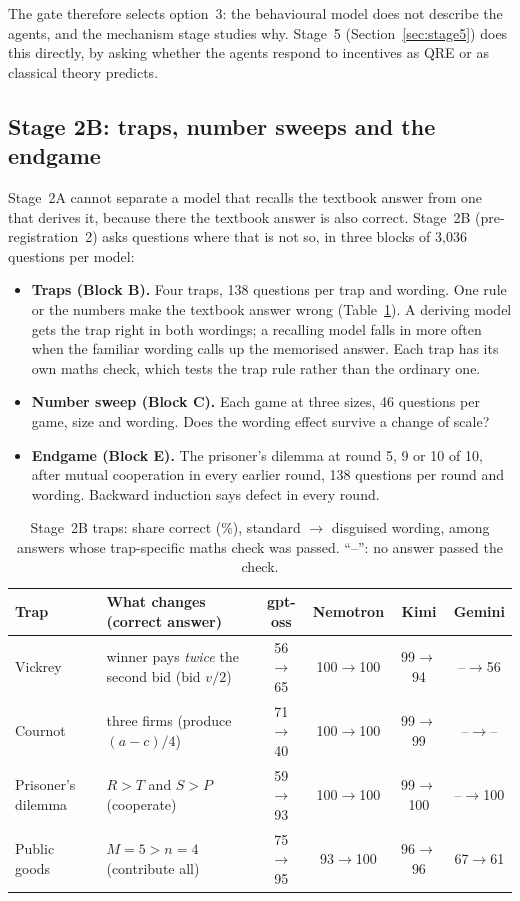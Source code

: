 \documentclass[11pt]{article}
\theoremstyle{definition}
\theoremstyle{remark}
\begin{document}
The gate therefore selects option~3: the behavioural model does not describe the agents, and the
mechanism stage studies why. Stage~5 (Section~\ref{sec:stage5}) does this directly, by asking
whether the agents respond to incentives as QRE or as classical theory predicts.

\subsection{Stage 2B: traps, number sweeps and the endgame}\label{sec:stage2b}
Stage~2A cannot separate a model that recalls the textbook answer from one that derives it,
because there the textbook answer is also correct. Stage~2B (pre-registration~2) asks questions
where that is not so, in three blocks of 3{,}036 questions per model:
\begin{itemize}
\item \textbf{Traps (Block B).} Four traps, 138 questions per trap and wording. One rule or the
  numbers make the textbook answer wrong
  (Table~\ref{tab:traps}). A deriving model gets the trap right in both wordings; a recalling
  model falls in more often when the familiar wording calls up the memorised answer. Each trap
  has its own maths check, which tests the trap rule rather than the ordinary one.
\item \textbf{Number sweep (Block C).} Each game at three sizes, 46 questions per game, size and
  wording. Does the wording effect
  survive a change of scale?
\item \textbf{Endgame (Block E).} The prisoner's dilemma at round 5, 9 or 10 of 10, after
  mutual cooperation in every earlier round, 138 questions per round and wording. Backward induction says defect in every round.
\end{itemize}

\begin{table}[t]
\centering
\caption{Stage~2B traps: share correct (\%), standard $\to$ disguised wording, among answers
whose trap-specific maths check was passed. ``--'': no answer passed the check.}
\label{tab:traps}
\small
\begin{tabular}{@{}>{\raggedright}p{2.0cm}>{\raggedright\arraybackslash}p{4.3cm}cccc@{}}
\toprule
Trap & What changes (correct answer) & gpt-oss & Nemotron & Kimi & Gemini \\
\midrule
Vickrey & winner pays \emph{twice} the second bid (bid $v/2$) & 56$\to$65 & 100$\to$100 & 99$\to$94 & --$\to$56 \\
Cournot & three firms (produce $(a-c)/4$) & 71$\to$40 & 100$\to$100 & 99$\to$99 & --$\to$-- \\
Prisoner's dilemma & $R>T$ and $S>P$ (cooperate) & 59$\to$93 & 100$\to$100 & 99$\to$100 & --$\to$100 \\
Public goods & $M=5>n=4$ (contribute all) & 75$\to$95 & 93$\to$100 & 96$\to$96 & 67$\to$61 \\
\bottomrule
\end{tabular}
\end{table}
\end{document}
